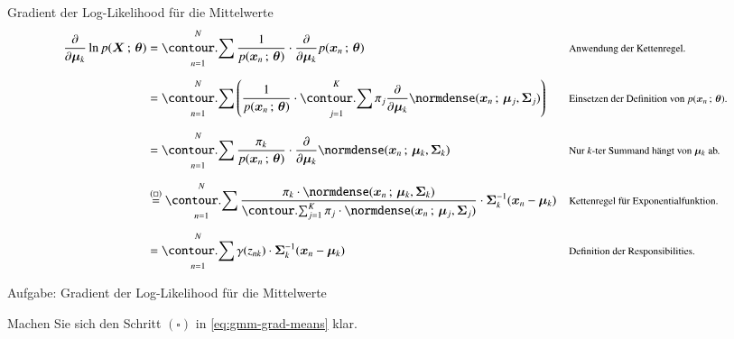 \begin{frame}{Gradient der Log-Likelihood für die Mittelwerte}{}
	\vspace*{-9mm}
	\begin{equation} \label{eq:gmm-grad-means}
		\begin{aligned}
			\frac{\partial}{\partial \bmu_k} \ln p(\bX \param \btheta)
				&= \sum_{n=1}^N \frac{1}{p(\bx_n \param \btheta)} \cdot \frac{\partial}{\partial \bmu_k} p(\bx_n \param \btheta)
				&& \rem{Anwendung der Kettenregel.}
		\\[2mm]
				&= \sum_{n=1}^N \left( \frac{1}{p(\bx_n \param \btheta)} \cdot
					\sum_{j=1}^K \pi_j \frac{\partial}{\partial \bmu_k} \normdense(\bx_n \param \bmu_j, \bSigma_j) \right)
				&& \rem{Einsetzen der Definition von $p(\bx_n \param \btheta)$.}
		\\[2mm]
				&= \sum_{n=1}^N \frac{\pi_k}{p(\bx_n \param \btheta)} \cdot
					\frac{\partial}{\partial \bmu_k} \normdense(\bx_n \param \bmu_k, \bSigma_k)
				&& \rem{Nur $k$-ter Summand hängt von $\bmu_k$ ab.}
		\\[2mm]
				&\overset{(\square)}{=} \sum_{n=1}^N \frac{\pi_k \cdot \normdense(\bx_n \param \bmu_k, \bSigma_k)}{
					\sum_{j=1}^K \pi_j \cdot \normdense(\bx_n \param \bmu_j, \bSigma_j)} \cdot \bSigma_k^{-1} (\bx_n - \bmu_k)
				&& \rem{Kettenregel für Exponentialfunktion.}
		\\[2mm]
				&= \sum_{n=1}^N \gamma(z_{nk}) \cdot \bSigma_k^{-1} (\bx_n - \bmu_k)
				&& \rem{Definition der Responsibilities.}
		\end{aligned}
	\end{equation}
\end{frame}


\begin{frame}{Aufgabe: Gradient der Log-Likelihood für die Mittelwerte}{}
	\begin{mytask}
		Machen Sie sich den Schritt $(\square)$ in \eqref{eq:gmm-grad-means} klar.
	\end{mytask}
\end{frame}


